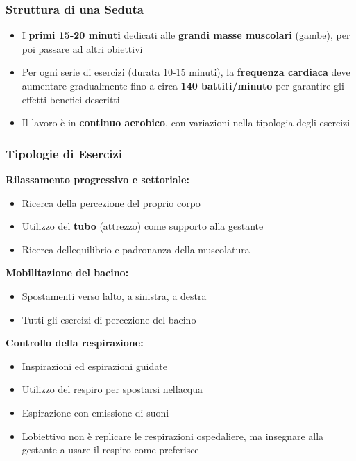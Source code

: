 \documentclass[a4paper,11pt]{article}
\providecommand{\tightlist}{%
  \setlength{\itemsep}{0pt}\setlength{\parskip}{0pt}}
\begin{document}
\subsubsection{Struttura di una Seduta}\label{struttura-di-una-seduta}

\begin{itemize}
      \tightlist
      \item
            I \textbf{primi 15-20 minuti} dedicati alle \textbf{grandi masse
                  muscolari} (gambe), per poi passare ad altri obiettivi
      \item
            Per ogni serie di esercizi (durata 10-15 minuti), la \textbf{frequenza
                  cardiaca} deve aumentare gradualmente fino a circa \textbf{140
                  battiti/minuto} per garantire gli effetti benefici descritti
      \item
            Il lavoro è in \textbf{continuo aerobico}, con variazioni nella
            tipologia degli esercizi
\end{itemize}

\subsubsection{Tipologie di Esercizi}\label{tipologie-di-esercizi}

\textbf{Rilassamento progressivo e settoriale:}

\begin{itemize}
      \tightlist
      \item
            Ricerca della percezione del proprio corpo
      \item
            Utilizzo del \textbf{tubo} (attrezzo) come supporto alla gestante
      \item
            Ricerca dell\textquotesingle equilibrio e padronanza della muscolatura
\end{itemize}

\textbf{Mobilitazione del bacino:}

\begin{itemize}
      \tightlist
      \item
            Spostamenti verso l\textquotesingle alto, a sinistra, a destra
      \item
            Tutti gli esercizi di percezione del bacino
\end{itemize}

\textbf{Controllo della respirazione:}

\begin{itemize}
      \tightlist
      \item
            Inspirazioni ed espirazioni guidate
      \item
            Utilizzo del respiro per spostarsi nell\textquotesingle acqua
      \item
            Espirazione con emissione di suoni
      \item
            L\textquotesingle obiettivo non è replicare le respirazioni
            ospedaliere, ma insegnare alla gestante a usare il respiro come
            preferisce
\end{itemize}
\end{document}
